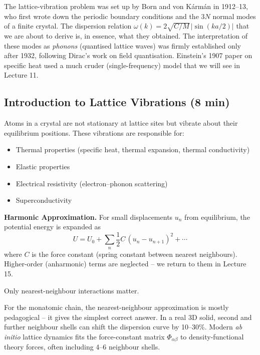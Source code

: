 \documentclass[11pt,a4paper]{article}
\begin{document}
\begin{histbox}
The lattice-vibration problem was set up by Born and von K\'arm\'an in 1912--13, who
first wrote down the periodic boundary conditions and the $3N$ normal modes of a
finite crystal. The dispersion relation $\omega(k) = 2\sqrt{C/M}\,|\sin(ka/2)|$ that
we are about to derive is, in essence, what they obtained. The interpretation of
these modes as \emph{phonons} (quantised lattice waves) was firmly established only
after 1932, following Dirac's work on field quantisation. Einstein's 1907 paper on
specific heat used a much cruder (single-frequency) model that we will see in
Lecture 11.
\end{histbox}

\subsection{Introduction to Lattice Vibrations \hfill \small(8 min)}

\begin{physbox}
Atoms in a crystal are not stationary at lattice sites but vibrate about their
equilibrium positions. These vibrations are responsible for:
\begin{itemize}
\item Thermal properties (specific heat, thermal expansion, thermal conductivity)
\item Elastic properties
\item Electrical resistivity (electron--phonon scattering)
\item Superconductivity
\end{itemize}
\end{physbox}

\textbf{Harmonic Approximation.} For small displacements $u_n$ from equilibrium, the
potential energy is expanded as
\[
U = U_0 + \sum_n \frac12 C\,(u_n - u_{n+1})^2 + \cdots
\]
where $C$ is the force constant (spring constant between nearest neighbours).
Higher-order (anharmonic) terms are neglected -- we return to them in Lecture 15.

\begin{keybox}
Only nearest-neighbour interactions matter.
\end{keybox}

\begin{pitbox}
For the monatomic chain, the nearest-neighbour approximation is mostly pedagogical --
it gives the simplest correct answer. In a real 3D solid, second and further
neighbour shells can shift the dispersion curve by 10--30\%. Modern
\emph{ab initio} lattice dynamics fits the force-constant matrix $\Phi_{\alpha\beta}$
to density-functional theory forces, often including 4--6 neighbour shells.
\end{pitbox}
\end{document}
